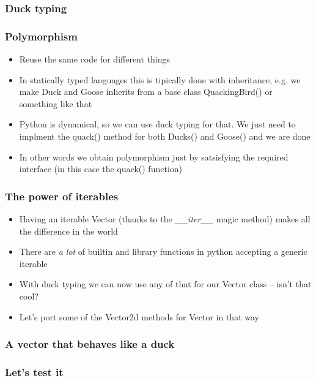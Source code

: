 \documentclass[9pt]{beamer}
\begin{document}
\begin{frame}
  \frametitle{Duck typing}
  
\end{frame}


\begin{frame}
  \frametitle{Polymorphism}
  
  \begin{itemize}
    \item Reuse the same code for different things
    \medskip
    \item In statically typed languages this is tipically done with inheritance,
          e.g. we make Duck and Goose inherits from a base class QuackingBird()
          or something like that
    \medskip
    \item Python is dynamical, so we can use duck typing for that.
          We just need to implment the quack() method for both Ducks() and Goose() 
          and we are done
    \medskip
    \item In other words we obtain polymorphism just by satsisfying the required \alert{interface}
          (in this case the quack() function)
  \end{itemize}
  
\end{frame}


\begin{frame}
  \frametitle{The power of iterables}
  
  \begin{itemize}
    \item Having an iterable Vector (thanks to the \emph{\_\_iter\_\_} magic
          method) makes all the difference in the world
    \medskip
    \item There are \emph{a lot} of builtin and library functions in python accepting a
          generic iterable
    \medskip
    \item With duck typing we can now use any of that for our Vector class -- isn't that cool?
    \medskip
    \item Let's port some of the Vector2d methods for Vector in that way
  \end{itemize}
  
\end{frame}


\begin{frame}
  \frametitle{A vector that behaves like a duck}
  
\end{frame}


\begin{frame}
  \frametitle{Let's test it}
  
\end{frame}
\end{document}
